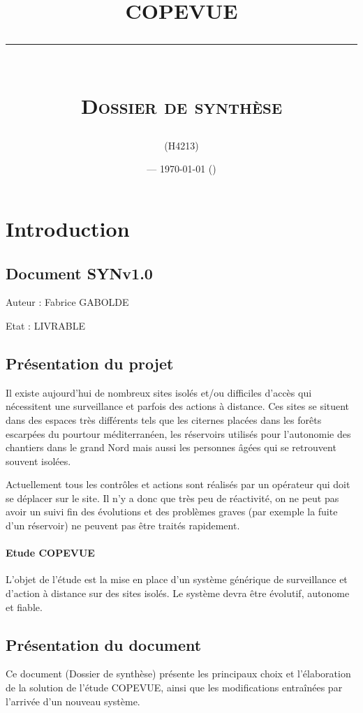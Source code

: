 \documentclass[a4paper, 11pt, draft]{article}
\title{\textbf{COPEVUE}\\
\rule{\textwidth}{1pt}{}\\
\Huge{\textsc{Dossier de synthèse}}}
\author{\docauthor{} (H4213)}
\date{\docname{} --- \today{} (\docstatus{})}
\newcommand\docname{SYNv1.0}
\newcommand\docauthor{Fabrice GABOLDE}
\newcommand\docstatus{LIVRABLE} %
\begin{document}
\maketitle

\tableofcontents

\section{Introduction}

\subsection*{Document \docname{}}

Auteur : \docauthor{}

Etat : \docstatus{}

\subsection{Présentation du projet}

Il existe aujourd'hui de nombreux sites isolés et/ou difficiles d'accès qui nécessitent une surveillance et parfois des actions à distance. Ces sites se situent dans des espaces très différents tels que les citernes placées dans les forêts escarpées du pourtour méditerranéen, les réservoirs utilisés pour l'autonomie des chantiers dans le grand Nord mais aussi les personnes âgées qui se retrouvent souvent isolées.

Actuellement tous les contrôles et actions sont réalisés par un opérateur qui doit se déplacer sur le site. Il n'y a donc que très peu de réactivité, on ne peut pas avoir un suivi fin des évolutions et des problèmes graves (par exemple la fuite d'un réservoir) ne peuvent pas être traités rapidement.

\paragraph{Etude COPEVUE}
L'objet de l'étude est la mise en place d'un système générique de surveillance et d'action à distance sur des sites isolés. Le système devra être évolutif, autonome et fiable.

\subsection{Présentation du document}

Ce document (Dossier de synthèse) présente les principaux choix et l'élaboration de la solution de l'étude COPEVUE, ainsi que les modifications entraînées par l'arrivée d'un nouveau système.
\end{document}
